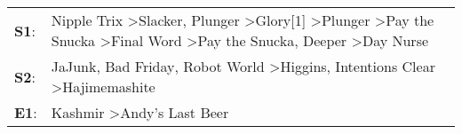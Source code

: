 \begin{supertabular}{p{0.03\textwidth}p{0.92\textwidth}}
 \textbf{S1}:  &  Nipple Trix\textsuperscript{} \textgreater \enspace Slacker\textsuperscript{}, \enspace Plunger\textsuperscript{} \textgreater \enspace Glory[1]\textsuperscript{} \textgreater \enspace Plunger\textsuperscript{} \textgreater \enspace Pay the Snucka\textsuperscript{} \textgreater \enspace Final Word\textsuperscript{} \textgreater \enspace Pay the Snucka\textsuperscript{}, \enspace Deeper\textsuperscript{} \textgreater \enspace Day Nurse\textsuperscript{}  \enspace  \\
 \textbf{S2}:  &                                                                                                                                                                                                                JaJunk\textsuperscript{}, \enspace Bad Friday\textsuperscript{}, \enspace Robot World\textsuperscript{} \textgreater \enspace Higgins\textsuperscript{}, \enspace Intentions Clear\textsuperscript{} \textgreater \enspace Hajimemashite\textsuperscript{}  \enspace  \\
 \textbf{E1}:  &                                                                                                                                                                                                                                                                                                                                                                                        Kashmir\textsuperscript{} \textgreater \enspace Andy's Last Beer\textsuperscript{}  \enspace  \\
\end{supertabular}
